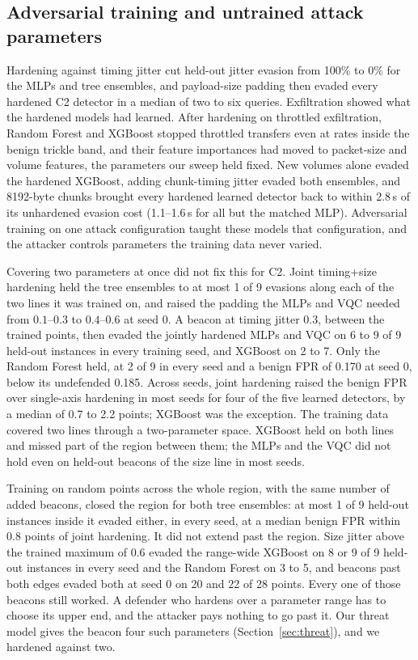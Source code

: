 \documentclass[preprint,12pt]{elsarticle}
\begin{document}
\subsection{Adversarial training and untrained attack parameters}
Hardening against timing jitter cut held-out jitter evasion from 100\% to 0\% for the MLPs and tree
ensembles, and payload-size padding then evaded every hardened C2 detector in a median of two to six
queries. Exfiltration showed what the hardened models had learned. After hardening on throttled
exfiltration, Random Forest and XGBoost stopped throttled transfers even at rates inside the benign
trickle band, and their feature importances had moved to packet-size and volume features, the
parameters our sweep held fixed. New volumes alone evaded the hardened XGBoost, adding chunk-timing
jitter evaded both ensembles, and 8192-byte chunks brought every hardened learned detector back to
within 2.8\,s of its unhardened evasion cost (1.1--1.6\,s for all but the matched MLP). Adversarial
training on one attack configuration taught these models that configuration, and the attacker controls
parameters the training data never varied.

Covering two parameters at once did not fix this for C2. Joint timing+size hardening held the tree
ensembles to at most 1 of 9 evasions along each of the two lines it was trained on, and raised the
padding the MLPs and VQC needed from $0.1$--$0.3$ to $0.4$--$0.6$ at seed 0. A beacon at timing jitter
$0.3$, between the trained points, then evaded the jointly hardened MLPs and VQC on 6 to 9 of 9 held-out
instances in every training seed, and XGBoost on 2 to 7. Only the Random Forest held, at 2 of 9 in every
seed and a benign FPR of 0.170 at seed 0, below its undefended 0.185. Across seeds, joint hardening raised
the benign FPR over single-axis hardening in most seeds for four of the five learned detectors, by a
median of 0.7 to 2.2 points; XGBoost was the exception. The training data covered two lines through a
two-parameter space. XGBoost held on both lines and missed part of the region between them; the MLPs
and the VQC did not hold even on held-out beacons of the size line in most seeds.

Training on random points across the whole region, with the same number of added beacons, closed the
region for both tree ensembles: at most 1 of 9 held-out instances inside it evaded either, in every
seed, at a median benign FPR within 0.8 points of joint hardening. It did not extend past the region.
Size jitter above the trained maximum of $0.6$ evaded the range-wide XGBoost on 8 or 9 of 9 held-out
instances in every seed and the Random Forest on 3 to 5, and beacons past both edges evaded both at
seed 0 on 20 and 22 of 28 points. Every one of those beacons still worked. A defender who hardens over a
parameter range has to choose its upper end, and the attacker pays nothing to go past it. Our threat
model gives the beacon four such parameters (Section~\ref{sec:threat}), and we hardened against two.
\end{document}
